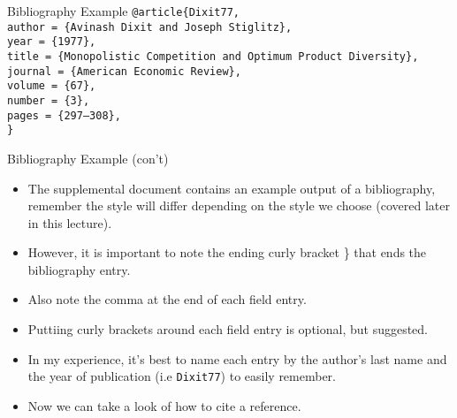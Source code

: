 \documentclass[pdf]{prosper}
\begin{document}
\begin{slide}{Bibliography Example}
	\texttt{@article\{Dixit77,} \\
	\indent \texttt{author = \{Avinash Dixit and Joseph Stiglitz\},} \\
	\indent \texttt{year = \{1977\},} \\
	\indent \texttt{title = \{Monopolistic Competition and Optimum Product Diversity\},} \\
	\indent \texttt{journal = \{American Economic Review\},} \\
	\indent \texttt{volume = \{67\},} \\
	\indent \texttt{number = \{3\},} \\
	\indent \texttt{pages = \{297--308\},} \\
	\texttt{\}}
\end{slide}
\begin{slide}{Bibliography Example (con't)}
	\begin{itemize}
		\item The supplemental document contains an example output of a bibliography, remember the style will differ depending on the style we choose (covered later in this lecture).
		\item However, it is important to note the ending curly bracket \} that ends the bibliography entry.
		\item Also note the comma at the end of each field entry.
		\item Puttiing curly brackets around each field entry is optional, but suggested.
		\item In my experience, it's best to name each entry by the author's last name and the year of publication (i.e \texttt{Dixit77}) to easily remember.
		\item Now we can take a look of how to cite a reference.
	\end{itemize}
\end{slide}
\end{document}
